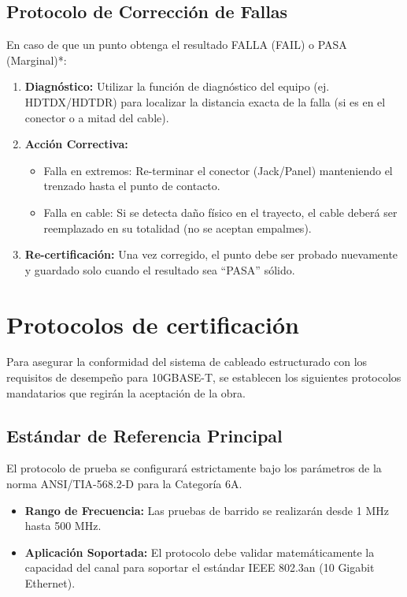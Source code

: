 \subsection*{Protocolo de Corrección de Fallas}

En caso de que un punto obtenga el resultado FALLA (FAIL) o PASA (Marginal)*:

\begin{enumerate}
    \item \textbf{Diagnóstico:} Utilizar la función de diagnóstico del equipo (ej. HDTDX/HDTDR) para localizar la distancia exacta de la falla (si es en el conector o a mitad del cable).
    \item \textbf{Acción Correctiva:}
    \begin{itemize}
        \item Falla en extremos: Re-terminar el conector (Jack/Panel) manteniendo el trenzado hasta el punto de contacto.
        \item Falla en cable: Si se detecta daño físico en el trayecto, el cable deberá ser reemplazado en su totalidad (no se aceptan empalmes).
    \end{itemize}
    \item \textbf{Re-certificación:} Una vez corregido, el punto debe ser probado nuevamente y guardado solo cuando el resultado sea ``PASA'' sólido.
\end{enumerate}

\section{Protocolos de certificación}

Para asegurar la conformidad del sistema de cableado estructurado con los requisitos de desempeño para 10GBASE-T, se establecen los siguientes protocolos mandatarios que regirán la aceptación de la obra.

\subsection*{Estándar de Referencia Principal}

El protocolo de prueba se configurará estrictamente bajo los parámetros de la norma ANSI/TIA-568.2-D para la Categoría 6A.

\begin{itemize}
    \item \textbf{Rango de Frecuencia:} Las pruebas de barrido se realizarán desde 1 MHz hasta 500 MHz.
    \item \textbf{Aplicación Soportada:} El protocolo debe validar matemáticamente la capacidad del canal para soportar el estándar IEEE 802.3an (10 Gigabit Ethernet).
\end{itemize}

